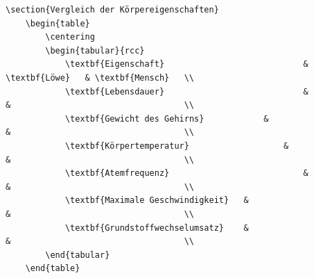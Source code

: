 \documentclass["WS\space 16-17\space -\space LaTeX-Kurs\space -\space Praesentation\space -\space 2.tex"]{subfiles}
\begin{document}
\begin{frame}[fragile]
	\Code
	\begin{lstlisting}[tabsize= 2]
\section{Vergleich der Körpereigenschaften}
	\begin{table}
		\centering
		\begin{tabular}{rcc}
			\textbf{Eigenschaft}							&	\textbf{Löwe}	& \textbf{Mensch} 	\\ 
			\textbf{Lebensdauer} 							&								& 									\\ 
			\textbf{Gewicht des Gehirns}			&								& 									\\ 
			\textbf{Körpertemperatur}					&								& 									\\
			\textbf{Atemfrequenz}							&								& 									\\
			\textbf{Maximale Geschwindigkeit}	&								& 									\\ 
			\textbf{Grundstoffwechselumsatz}	&								& 									\\
		\end{tabular}
	\end{table}
	\end{lstlisting}
\end{frame}
\end{document}
